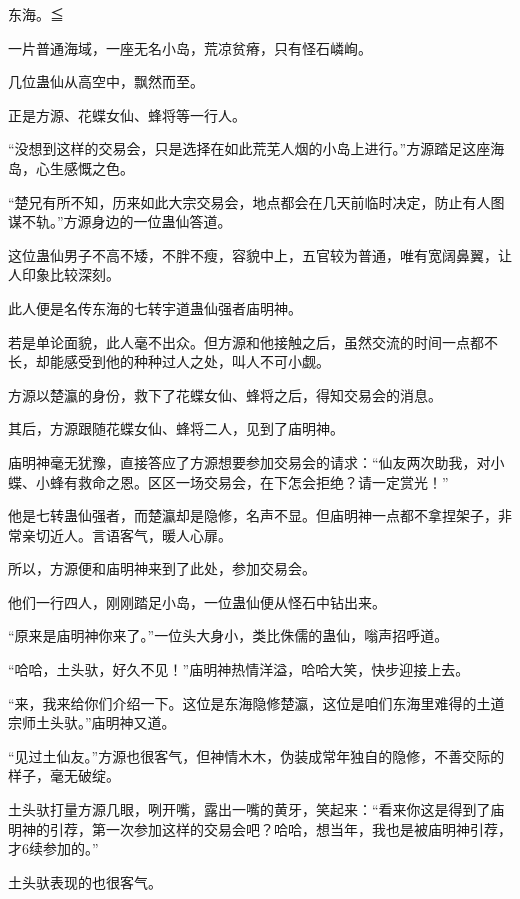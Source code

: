 
\begin{this_body}

东海。≦

一片普通海域，一座无名小岛，荒凉贫瘠，只有怪石嶙峋。

几位蛊仙从高空中，飘然而至。

正是方源、花蝶女仙、蜂将等一行人。

“没想到这样的交易会，只是选择在如此荒芜人烟的小岛上进行。”方源踏足这座海岛，心生感慨之色。

“楚兄有所不知，历来如此大宗交易会，地点都会在几天前临时决定，防止有人图谋不轨。”方源身边的一位蛊仙答道。

这位蛊仙男子不高不矮，不胖不瘦，容貌中上，五官较为普通，唯有宽阔鼻翼，让人印象比较深刻。

此人便是名传东海的七转宇道蛊仙强者庙明神。

若是单论面貌，此人毫不出众。但方源和他接触之后，虽然交流的时间一点都不长，却能感受到他的种种过人之处，叫人不可小觑。

方源以楚瀛的身份，救下了花蝶女仙、蜂将之后，得知交易会的消息。

其后，方源跟随花蝶女仙、蜂将二人，见到了庙明神。

庙明神毫无犹豫，直接答应了方源想要参加交易会的请求：“仙友两次助我，对小蝶、小蜂有救命之恩。区区一场交易会，在下怎会拒绝？请一定赏光！”

他是七转蛊仙强者，而楚瀛却是隐修，名声不显。但庙明神一点都不拿捏架子，非常亲切近人。言语客气，暖人心扉。

所以，方源便和庙明神来到了此处，参加交易会。

他们一行四人，刚刚踏足小岛，一位蛊仙便从怪石中钻出来。

“原来是庙明神你来了。”一位头大身小，类比侏儒的蛊仙，嗡声招呼道。

“哈哈，土头驮，好久不见！”庙明神热情洋溢，哈哈大笑，快步迎接上去。

“来，我来给你们介绍一下。这位是东海隐修楚瀛，这位是咱们东海里难得的土道宗师土头驮。”庙明神又道。

“见过土仙友。”方源也很客气，但神情木木，伪装成常年独自的隐修，不善交际的样子，毫无破绽。

土头驮打量方源几眼，咧开嘴，露出一嘴的黄牙，笑起来：“看来你这是得到了庙明神的引荐，第一次参加这样的交易会吧？哈哈，想当年，我也是被庙明神引荐，才6续参加的。”

土头驮表现的也很客气。


\end{this_body}
